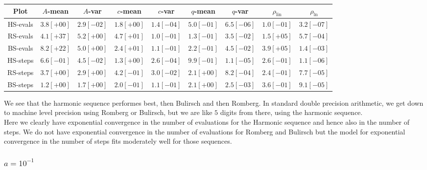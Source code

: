 \begin{table}[H]
    \centering
        \small
        \begin{tabular}{c||c|c|c|c|c|c|c|c}
Plot & \(A\)-mean & \(A\)-var & \(c\)-mean & \(c\)-var & \(q\)-mean & \(q\)-var & \(\rho_{\operatorname{lin}}\) & \(\rho_{\ln}\)\\\hline
\rowcolor{green}
HS-evals & \(3.8[+00]\) & \(2.9[-02]\) & \(1.8[+00]\) & \(1.4[-04]\) & \(5.0[-01]\) & \(6.5[-06]\) & \(1.0[-01]\) & \(3.2[-07]\) \\
\rowcolor{yellow}
RS-evals & \(4.1[+37]\) & \(5.2[+00]\) & \(4.7[+01]\) & \(1.0[-01]\) & \(1.3[-01]\) & \(3.5[-02]\) & \(1.5[+05]\) & \(5.7[-04]\) \\
\rowcolor{yellow}
BS-evals & \(8.2[+22]\) & \(5.0[+00]\) & \(2.4[+01]\) & \(1.1[-01]\) & \(2.2[-01]\) & \(4.5[-02]\) & \(3.9[+05]\) & \(1.4[-03]\) \\
\rowcolor{green}
HS-steps & \(6.6[-01]\) & \(4.5[-02]\) & \(1.3[+00]\) & \(2.6[-04]\) & \(9.9[-01]\) & \(1.1[-05]\) & \(2.6[-01]\) & \(1.1[-06]\) \\
\rowcolor{red}
RS-steps & \(3.7[+00]\) & \(2.9[+00]\) & \(4.2[-01]\) & \(3.0[-02]\) & \(2.1[+00]\) & \(8.2[-04]\) & \(2.4[-01]\) & \(7.7[-05]\) \\
\rowcolor{red}
BS-steps & \(1.2[+00]\) & \(1.7[+00]\) & \(2.0[-01]\) & \(1.1[-01]\) & \(2.1[+00]\) & \(2.5[-03]\) & \(3.6[-01]\) & \(9.1[-05]\) \\
    \end{tabular}
    \label{tab:my_label}
\end{table}

We see that the harmonic sequence performes best, then Bulirsch and then Romberg. In standard double precision arithmetic, we get down to machine level precision using Romberg or Bulirsch, but we are like \(5\) digits from there, using the harmonic sequence.\\

Here we clearly have exponential convergence in the number of evaluations for the Harmonic sequence and hence also in the number of steps. We do not have exponential convergence in the number of evaluations for Romberg and Bulirsch but the model for exponential convergence in the number of steps fits moderately well for those sequences. 

\subsubsection{\(a = 10^{-1}\)}

